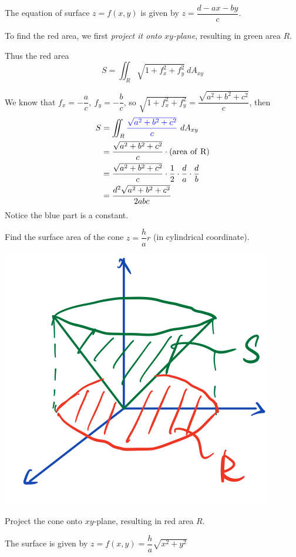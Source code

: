 \begin{spacing}{1.3}
    \sol The equation of surface $z=f(x,y)$ is given by $z=\dfrac{d-ax-by}{c}$.

    To find the red area, we first {\it project it onto $xy$-plane}, resulting in green area $R$.

    Thus the red area $$S=\iint_R\sqrt{1+f_x^2+f_y^2}\ dA_{xy}$$

    We know that $f_x=-\dfrac{a}{c},\ f_y=-\dfrac{b}{c}$, so 
    $\sqrt{1+f_x^2+f_y^2}=\dfrac{\sqrt{a^2+b^2+c^2}}{c}$, then
    \begin{align*}
        S &= \iint_R{\blue \dfrac{\sqrt{a^2+b^2+c^2}}{c}}\ dA_{xy}\\
          &= \dfrac{\sqrt{a^2+b^2+c^2}}{c}\cdot {\rm (area\ of\ R)}\\
          &= \dfrac{\sqrt{a^2+b^2+c^2}}{c}\cdot \frac{1}{2}\cdot \frac{d}{a}\cdot \frac{d}{b}\\
          &= \frac{d^2\sqrt{a^2+b^2+c^2}}{2abc}
    \end{align*}
    Notice the blue part is a constant.

    \newpage
    \eg Find the surface area of the cone $z=\dfrac{h}{a}r$ (in cylindrical coordinate).
    \begin{center}
        \includegraphics[scale=0.25]{images/Ch14-surface-area-eg2.jpeg}
    \end{center}

    \sol Project the cone onto $xy$-plane, resulting in red area $R$.

    The surface is given by $z=f(x,y)=\dfrac{h}{a}\sqrt{x^2+y^2}$


\end{spacing}
